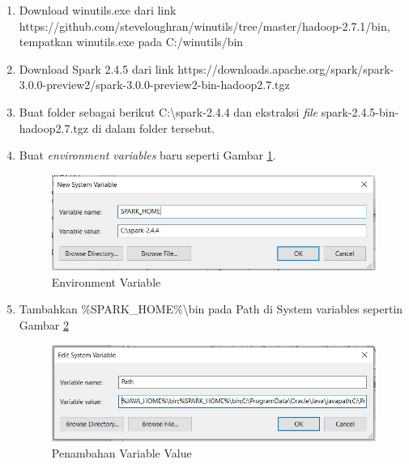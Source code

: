 \documentclass[a4paper,twoside]{article}
\begin{document}
\begin{enumerate}
\begin{enumerate}
\item Download winutils.exe dari link \textsf{https://github.com/steveloughran/winutils/tree/master/hadoop-2.7.1/bin}, tempatkan winutils.exe pada \textsf{C:/winutils/bin}

\item Download Spark 2.4.5 dari link \textsf{https://downloads.apache.org/spark/spark-3.0.0-preview2/spark-3.0.0-preview2-bin-hadoop2.7.tgz}

\item Buat folder sebagai berikut \textsf{C:\textbackslash spark-2.4.4} dan ekstraksi \textit{file} \textsf{spark-2.4.5-bin-hadoop2.7.tgz} di dalam folder tersebut.

\item Buat \textit{environment variables} baru seperti Gambar \ref{fig:spark_instal_3}.

\begin{figure}[H]
	\centering
	\includegraphics[scale=0.6]{spark_instal_3}
	\caption{Environment Variable}
	\label{fig:spark_instal_3}
\end{figure}

\item Tambahkan \textsf{\%SPARK\_HOME\%\textbackslash bin} pada Path di System variables sepertin Gambar \ref{fig:spark_instal_5}

\begin{figure}[H]
	\centering
	\includegraphics[scale=0.6]{spark_instal_5}
	\caption{Penambahan Variable Value}
	\label{fig:spark_instal_5}
\end{figure}

\end{enumerate}


\end{enumerate}
\end{document}
